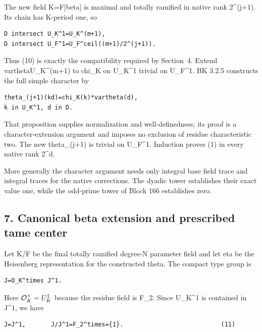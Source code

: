 The new field K=F{[}beta{]} is maximal and totally ramified in native
rank 2\^{}(j+1). Its chain has K-period one, so

\begin{Verbatim}[fontsize=\small,breaklines=true,breakanywhere=true]
D intersect U_K^1=U_K^(m+1),
D intersect U_F^1=U_F^ceil((m+1)/2^(j+1)).
\end{Verbatim}

Thus (10) is exactly the compatibility required by Section~4. Extend
vartheta\textbar U\_K\^{}(m+1) to chi\_K on U\_K\^{}1 trivial on
U\_F\^{}1. BK 3.2.5 constructs the full simple character by

\begin{Verbatim}[fontsize=\small,breaklines=true,breakanywhere=true]
theta_(j+1)(kd)=chi_K(k)*vartheta(d),
k in U_K^1, d in D.
\end{Verbatim}

That proposition supplies normalization and well-definedness; its proof
is a character-extension argument and imposes no exclusion of residue
characteristic two. The new theta\_(j+1) is trivial on U\_F\^{}1.
Induction proves (1) in every native rank 2\^{}d.

More generally the character argument needs only integral base field
trace and integral traces for the native corrections. The dyadic tower
establishes their exact value one, while the odd-prime tower of Block 166
establishes zero.

\hypertarget{dyadic_character-canonical-beta-extension-and-prescribed-tame-center}{%
\subsection{7. Canonical beta extension and prescribed tame
center}\label{dyadic_character-canonical-beta-extension-and-prescribed-tame-center}}

Let K/F be the final totally ramified degree-N parameter field and let
eta be the Heisenberg representation for the constructed theta. The
compact type group is

\begin{Verbatim}[fontsize=\small,breaklines=true,breakanywhere=true]
J=O_K^times J^1.
\end{Verbatim}

Here \(\mathcal O_K^\times=U_K^1\) because the residue field is
F\_2. Since U\_K\^{}1 is contained in J\^{}1, we have

\begin{Verbatim}[fontsize=\small,breaklines=true,breakanywhere=true]
J=J^1,       J/J^1=F_2^times={1}.                           (11)
\end{Verbatim}

